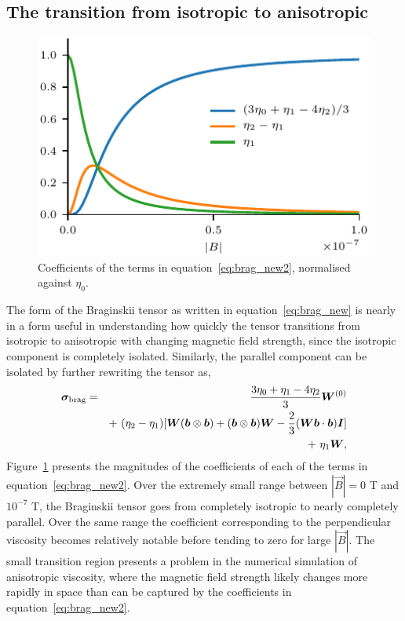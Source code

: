 \subsection{The transition from isotropic to anisotropic}

\begin{figure}[t]
  \centering
  \includegraphics[width=0.5\linewidth]{brag_coeffs_2.pdf}
  \caption{Coefficients of the terms in equation~\ref{eq:brag_new2}, normalised against $\eta_0$.}%
  \label{fig:brag_coeffs2}
\end{figure}

The form of the Braginskii tensor as written in equation~\ref{eq:brag_new} is nearly in a form useful in understanding how quickly the tensor transitions from isotropic to anisotropic with changing magnetic field strength, since the isotropic component is completely isolated. Similarly, the parallel component can be isolated by further rewriting the tensor as,
\begin{eqnarray}\label{eq:brag_new2}
\ten{\sigma}_{\rm brag} = &&\frac{3\eta_0+\eta_1-4\eta_2}{3}\ten{W}^{(0)}\\%
\nonumber
& &+~ (\eta_2-\eta_1)[\ten{W}(\vec{b}\otimes\vec{b})+(\vec{b}\otimes\vec{b})\ten{W} - \frac{2}{3}(\ten{W}\vec{b}\cdot\vec{b})\ten{I}] \\%
\nonumber
& &+~ \eta_1\ten{W},%
\end{eqnarray}
Figure~\ref{fig:brag_coeffs2} presents the magnitudes of the coefficients of each of the terms in equation~\ref{eq:brag_new2}. Over the extremely small range between $|\vec{B}| = 0$ T and $10^{-7}$ T, the Braginskii tensor goes from completely isotropic to nearly completely parallel. Over the same range the coefficient corresponding to the perpendicular viscosity becomes relatively notable before tending to zero for large $|\vec{B}|$. The small transition region presents a problem in the numerical simulation of anisotropic viscosity, where the magnetic field strength likely changes more rapidly in space than can be captured by the coefficients in equation~\ref{eq:brag_new2}. 

